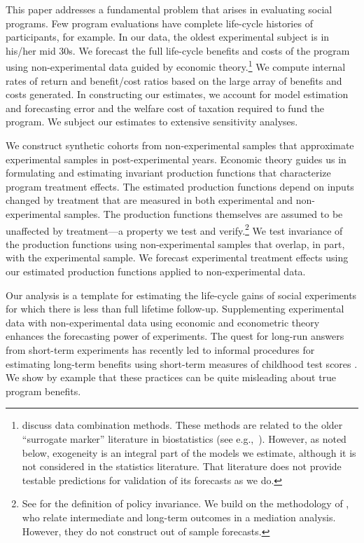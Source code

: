 This paper addresses a fundamental problem that arises in evaluating social programs. Few program evaluations have complete life-cycle histories of participants, for example. In our data, the oldest experimental subject is in his/her mid 30s. We forecast the full life-cycle benefits and costs of the program using non-experimental data guided by economic theory.\footnote{\citet{Ridder_Moffitt_2007_hbk_metricsdata} discuss data combination methods. These methods are related to the older ``surrogate marker'' literature in biostatistics (see e.g.,\ \citealp{Prentice_1989_Surrogate_SiM}). However, as noted below, exogeneity is an integral part of the models we estimate, although it is not considered in the statistics literature. That literature does not provide testable predictions for validation of its forecasts as we do.} We compute internal rates of return and benefit/cost ratios based on the large array of benefits and costs generated. In constructing our estimates, we account for model estimation and forecasting error and the welfare cost of taxation required to fund the program. We subject our estimates to extensive sensitivity analyses.

We construct synthetic cohorts from non-experimental samples that approximate experimental samples in post-experimental years. Economic theory guides us in formulating and estimating invariant production functions that characterize program treatment effects. The estimated production functions depend on inputs changed by treatment that are measured in both experimental and non-experimental samples. The production functions themselves are assumed to be unaffected by treatment---a property we test and verify.\footnote{See \cite{Hurwicz_1962_structural} for the definition of policy invariance. We build on the methodology of \citet{Heckman_Pinto_etal_2013_PerryFactor}, who relate intermediate and long-term outcomes in a mediation analysis. However, they do not construct out of sample forecasts.} We test invariance of the production functions using non-experimental samples that overlap, in part, with the experimental sample. We forecast experimental treatment effects using our estimated production functions applied to non-experimental data.

Our analysis is a template for estimating the life-cycle gains of social experiments for which there is less than full lifetime follow-up. Supplementing experimental data with non-experimental data using economic and econometric theory enhances the forecasting power of experiments. The quest for long-run answers from short-term experiments has recently led to informal procedures for estimating long-term benefits using short-term measures of childhood test scores \citep[e.g.][]{Chetty_Friedman_etal_2011_QJoE,Kline_Walters_2016_QJE}. We show by example that these practices can be quite misleading about true program benefits.

